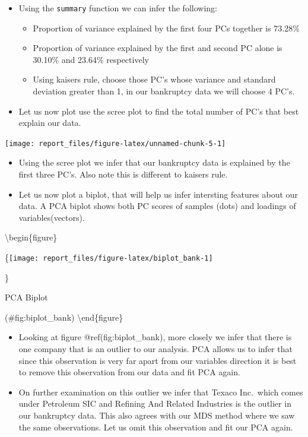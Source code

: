 \documentclass[
]{article}
\providecommand{\tightlist}{%
  \setlength{\itemsep}{0pt}\setlength{\parskip}{0pt}}
\begin{document}
\begin{itemize}
\tightlist
\item
  Using the \texttt{summary} function we can infer the following:

  \begin{itemize}
  \tightlist
  \item
    Proportion of variance explained by the first four PCs together is 73.28\%
  \item
    Proportion of variance explained by the first and second PC alone is 30.10\% and 23.64\% respectively
  \item
    Using kaisers rule, choose those PC's whose variance and standard deviation greater than 1, in our bankruptcy data we will choose 4 PC's.
  \end{itemize}
\item
  Let us now plot use the scree plot to find the total number of PC's that best explain our data.
\end{itemize}

\begin{center}\texttt{[image: report\_files/figure-latex/unnamed-chunk-5-1]} \end{center}

\begin{itemize}
\item
  Using the scree plot we infer that our bankruptcy data is explained by the first three PC's. Also note this is different to kaisers rule.
\item
  Let us now plot a biplot, that will help us infer intersting features about our data. A PCA biplot shows both PC scores of samples (dots) and loadings of variables(vectors).
\end{itemize}

\textbackslash begin\{figure\}

\{\centering \texttt{[image: report\_files/figure-latex/biplot\_bank-1]}

\}

\caption{PCA Biplot}

(\#fig:biplot\_bank)
\textbackslash end\{figure\}

\begin{itemize}
\item
  Looking at figure @ref(fig:biplot\_bank), more closely we infer that there is one company that is an outlier to our analysis. PCA allows us to infer that since this observation is very far apart from our variables direction it is best to remove this observation from our data and fit PCA again.
\item
  On further examination on this outlier we infer that Texaco Inc.~which comes under Petroleum SIC and Refining And Related Industries is the outlier in our bankruptcy data. This also agrees with our MDS method where we saw the same observations. Let us omit this observation and fit our PCA again.
\end{itemize}
\end{document}
